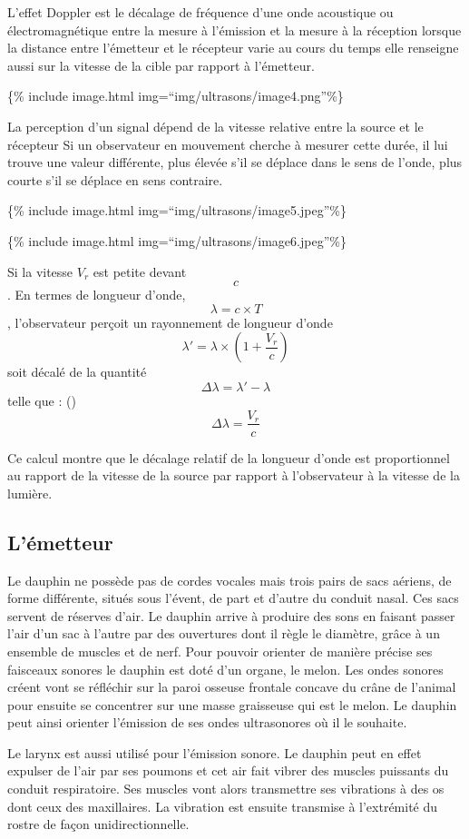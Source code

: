 L'effet Doppler est le décalage de fréquence d'une onde acoustique ou
électromagnétique entre la mesure à l'émission et la mesure à la
réception lorsque la distance entre l'émetteur et le récepteur varie au
cours du temps elle renseigne aussi sur la vitesse de la cible par
rapport à l'émetteur.

\{\% include image.html img=``img/ultrasons/image4.png''\%\}

La perception d'un signal dépend de la vitesse relative entre la source
et le récepteur Si un observateur en mouvement cherche à mesurer cette
durée, il lui trouve une valeur différente, plus élevée s'il se déplace
dans le sens de l'onde, plus courte s'il se déplace en sens contraire.

\{\% include image.html img=``img/ultrasons/image5.jpeg''\%\}

\{\% include image.html img=``img/ultrasons/image6.jpeg''\%\}

Si la vitesse \(V_r\) est petite devant \[c\]. En termes de longueur
d'onde, \[\lambda = c \times T\], l'observateur perçoit un rayonnement
de longueur d'onde
\[\lambda\prime = \lambda \times (1 + \frac{V_r}{c})\] soit décalé de la
quantité \[\Delta\lambda = \lambda\prime - \lambda\] telle que :
()
\[\Delta\lambda = \frac{V_r}{c}\]

Ce calcul montre que le décalage relatif de la longueur d'onde est
proportionnel au rapport de la vitesse de la source par rapport à
l'observateur à la vitesse de la lumière.

\subsection{L'émetteur}\label{luxe9metteur}

Le dauphin ne possède pas de cordes vocales mais trois pairs de sacs
aériens, de forme différente, situés sous l'évent, de part et d'autre du
conduit nasal. Ces sacs servent de réserves d'air. Le dauphin arrive à
produire des sons en faisant passer l'air d'un sac à l'autre par des
ouvertures dont il règle le diamètre, grâce à un ensemble de muscles et
de nerf. Pour pouvoir orienter de manière précise ses faisceaux sonores
le dauphin est doté d'un organe, le melon. Les ondes sonores créent vont
se réfléchir sur la paroi osseuse frontale concave du crâne de l'animal
pour ensuite se concentrer sur une masse graisseuse qui est le melon. Le
dauphin peut ainsi orienter l'émission de ses ondes ultrasonores où il
le souhaite.

Le larynx est aussi utilisé pour l'émission sonore. Le dauphin peut en
effet expulser de l'air par ses poumons et cet air fait vibrer des
muscles puissants du conduit respiratoire. Ses muscles vont alors
transmettre ses vibrations à des os dont ceux des maxillaires. La
vibration est ensuite transmise à l'extrémité du rostre de façon
unidirectionnelle.

